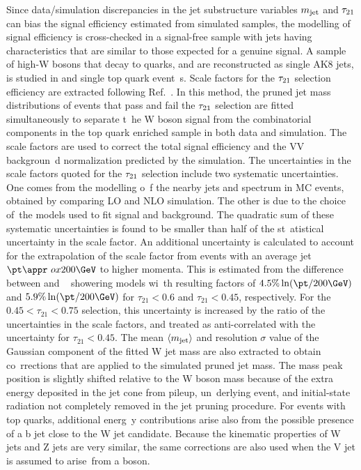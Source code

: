 Since data/simulation discrepancies in the jet substructure variables $m_{\text{jet}}$ and $\tau_{21}$ can bias the signal
efficiency estimated from simulated samples, the modelling of signal efficiency is cross-checked in a signal-free
sample with jets having characteristics that are similar to those expected for a genuine signal.
A sample of high-\pt W bosons that decay to quarks, and are reconstructed as single AK8 jets, is studied in \ttbar and single top quark event\
s.
Scale factors for the $\tau_{21}{}$ selection efficiency are extracted following Ref.~\cite{Khachatryan:2014vla}.
In this method, the pruned jet mass distributions of events that pass and fail the $\tau_{21}$ selection are fitted simultaneously to separate t\
he W boson signal from the combinatorial components in the top quark enriched sample in both data and simulation.
The scale factors are used to correct the total signal efficiency and the VV backgroun\
d normalization predicted by the simulation.
The uncertainties in the scale factors quoted for the $\tau_{21}$ selection include two systematic uncertainties. One comes from the modelling o\
f the nearby jets and \pt spectrum in \ttbar MC events, obtained by comparing LO and NLO \ttbar simulation. The other is due to the choice of\
 the models used to fit signal and background. The quadratic sum of these systematic uncertainties is found to be smaller than half of the st\
atistical uncertainty in the scale factor.
An additional uncertainty is calculated to account for the extrapolation of the scale factor from \ttbar events with an average jet $\pt\appr\
ox200\GeV$ to higher momenta. This is estimated from the difference between \PYTHIA{} and \HERWIG{++}~\cite{Bahr:2008pv} showering  models wi\
th resulting factors of
$4.5\% \ln (\pt/200\GeV)$
and $5.9\%  \ln (\pt/200\GeV)$
for $\tau_{21} < 0.6$ and $\tau_{21} < 0.45$, respectively.
For the $0.45<\tau_{21}<0.75$ selection, this uncertainty is increased by the ratio of the uncertainties in the scale factors,
and treated as anti-correlated with the uncertainty for $\tau_{21}<0.45$.
The mean $\langle m_{\text{jet}}\rangle$ and resolution $\sigma$ value of the Gaussian component of the fitted W jet mass are also extracted to obtain co\
rrections that are applied to the simulated pruned jet mass.
The mass peak position is slightly shifted relative to the W boson mass because of the extra energy deposited in the jet cone from pileup, un\
derlying event, and initial-state radiation not completely removed in the jet pruning procedure. For events with top quarks, additional energ\
y contributions arise also from the possible presence of a b jet close to the W jet candidate.
Because the kinematic properties of W jets and Z jets are very similar, the same corrections are also used when the V jet is assumed to arise\
 from a \Zo boson.


